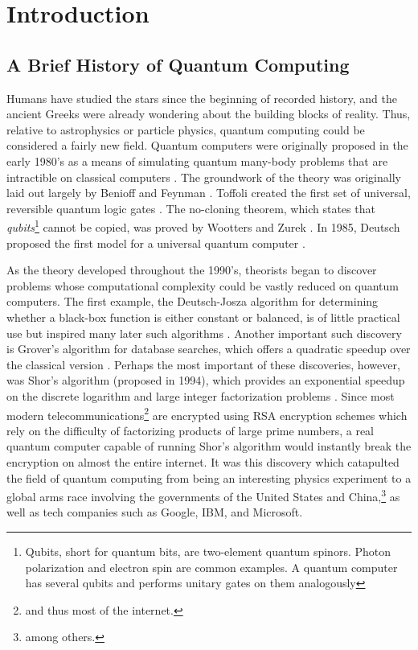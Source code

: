 \documentclass[12pt]{report}
\begin{document}
\tableofcontents


\chapter{Introduction}
\setcounter{page}{1}
\section{A Brief History of Quantum Computing}
\label{sec:brief-hist-quant}

Humans have studied the stars since the beginning of recorded history, and the ancient Greeks were already wondering about the building blocks of reality. Thus, relative to astrophysics or particle physics, quantum computing could be considered a fairly new field. Quantum computers were originally proposed in the early 1980's as a means of simulating quantum many-body problems that are intractible on classical computers \cite{Feynman1982}. The groundwork of the theory was originally laid out largely by Benioff and Feynman \cite{Benioff1980,Feynman1982}. Toffoli created the first set of universal, reversible quantum logic gates \cite{Toffoli1980}. The no-cloning theorem, which states that \textit{qubits}\footnote{ Qubits, short for quantum bits, are two-element quantum spinors. Photon polarization and electron spin are common examples. A quantum computer has several qubits and performs unitary gates on them analogously } cannot be copied, was proved by Wootters and Zurek \cite{Wootters1982}. In 1985, Deutsch proposed the first model for a universal quantum computer \cite{Deutsch1985}.

As the theory developed throughout the 1990's, theorists began to discover problems whose computational complexity could be vastly reduced on quantum computers. The first example, the Deutsch-Josza algorithm for determining whether a black-box function is either constant or balanced, is of little practical use but inspired many later such algorithms \cite{Deutsch1992}. Another important such discovery is Grover's algorithm for database searches, which offers a quadratic speedup over the classical version \cite{Grover1996}. Perhaps the most important of these discoveries, however, was Shor's algorithm (proposed in 1994), which provides an exponential speedup on the discrete logarithm and large integer factorization problems \cite{Shor1999}. Since most modern telecommunications\footnote{ and thus most of the internet.} are encrypted using RSA encryption schemes which rely on the difficulty of factorizing products of large prime numbers, a real quantum computer capable of running Shor's algorithm would instantly break the encryption on almost the entire internet. It was this discovery which catapulted the field of quantum computing from being an interesting physics experiment to a global arms race involving the governments of the United States and China,\footnote{ among others.} as well as tech companies such as Google, IBM, and Microsoft. 
\end{document}
